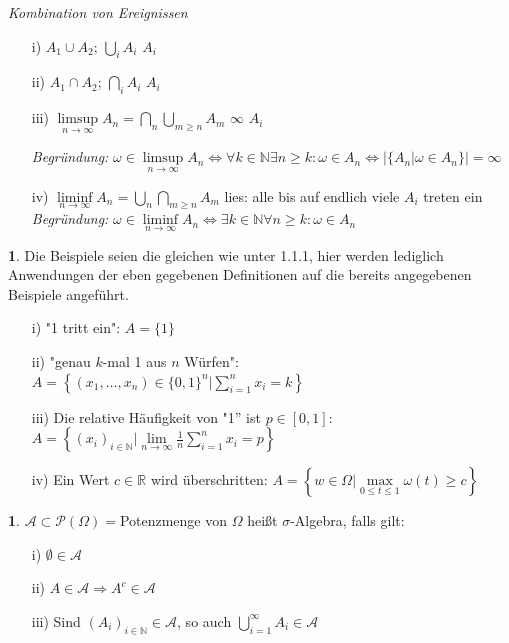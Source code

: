 \documentclass[10pt,a4paper]{report}
\numberwithin{equation}{section}
\numberwithin{figure}{section}
\theoremstyle{plain}
\theoremstyle{definition}
\newtheorem{defn}[thm]{\protect\definitionname}
\newtheorem{example}[thm]{\protect\examplename}
\theoremstyle{remark}
\theoremstyle{plain}
\providecommand{\definitionname}{Definition}
\providecommand{\examplename}{Beispiel}
\newcommand{\1}{ \mathbb{1} } %
\begin{document}
\textit{Kombination von Ereignissen}
\begin{itemize}
\item[i)] $A_1 \cup A_2$; $\bigcup\limits_i A_i$\qquad {} $A_i$  
\item[ii)] $A_1 \cap A_2$; $\bigcap\limits_i A_i$\qquad {} $A_i$  
\item[iii)] $\limsup\limits_{n \to \infty} A_n=\bigcap\limits_{n}\bigcup\limits_{m\geq n}A_m$\qquad {} $\infty$ $A_i$   

\textit{Begründung:} $\omega \in \limsup\limits_{n \to \infty} A_n \Leftrightarrow \forall k \in \mathbb{N} \exists n\geq k: \omega \in A_n \Leftrightarrow |\{A_n|\omega \in A_n\}|=\infty$
\item[iv)] $\liminf\limits_{n \to \infty} A_n=\bigcup\limits_{n}\bigcap\limits_{m\geq n}A_m$ \qquad lies: alle bis auf endlich viele $A_i$ treten ein
\textit{Begründung:} $\omega \in \liminf\limits_{n \to \infty} A_n \Leftrightarrow \exists k \in \mathbb{N} \forall n\geq k: \omega \in A_n$
\end{itemize}
\begin{example}
  Die Beispiele seien die gleichen wie unter 1.1.1, hier werden lediglich Anwendungen der eben gegebenen Definitionen auf die bereits angegebenen Beispiele angeführt.
  \begin{itemize}
    \item[i)] "1 tritt ein": $A=\{1\}$ 
    \item[ii)] "genau $k$-mal 1 aus $n$ Würfen": $A=\left\{(x_1,\dots,x_n) \in \{0,1\}^n| \sum\limits_{i=1}^nx_i=k\right\}$
    \item[iii)] Die relative Häufigkeit von "1'' ist $p \in [0,1]$: $A=\left\{(x_i)_{i \in \mathbb{N}}|\lim\limits_{n \to \infty}\frac{1}{n}\sum\limits_{i=1}^n x_i=p\right\}$
    \item[iv)] Ein Wert $c \in \mathbb{R}$ wird überschritten: $A=\left\{w \in \Omega| \max\limits_{0\leq t\leq 1}\omega(t)\geq c \right\}$  
  \end{itemize}
\end{example}
\begin{defn}
  $\mathcal{A}\subset \mathcal{P}(\Omega)=$Potenzmenge von  $\Omega$ heißt $\sigma$-Algebra, falls gilt: 
  \begin{itemize}
  \item[i)] $\emptyset \in \mathcal{A}$
  \item[ii)] $A\in \mathcal{A} \Rightarrow A^c
    \in \mathcal{A}$
  \item[iii)] Sind $(A_i)_{i \in \mathbb{N}} \in \mathcal{A}$,
    so auch $\bigcup\limits_{i=1}^\infty A_i \in \mathcal{A}$
  \end{itemize}
\end{defn}
\end{document}
